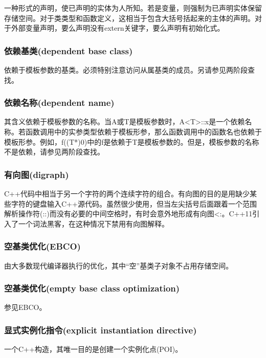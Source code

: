 一种形式的声明，使已声明的实体为人所知。若是变量，则强制为已声明实体保留存储空间。对于类类型和函数定义，这相当于包含大括号括起来的主体的声明。对于外部变量声明，要么声明没有extern关键字，要么声明有初始化式。

\subsubsection{依赖基类(dependent base class)}

依赖于模板参数的基类。必须特别注意访问从属基类的成员。另请参见两阶段查找。

\subsubsection{依赖名称(dependent name)}

其含义依赖于模板参数的名称。当A或T是模板参数时，A<T>::x是一个依赖名称。若函数调用中的实参类型依赖于模板形参，那么函数调用中的函数名也依赖于模板形参。例如，f((T*)0)中的f是依赖于T是模板参数的。但是，模板参数的名称不是依赖，请参见两阶段查找。

\subsubsection{有向图(digraph)}

C++代码中相当于另一个字符的两个连续字符的组合。有向图的目的是用缺少某些字符的键盘输入C++源代码。虽然很少使用，但当左尖括号后面跟着一个范围解析操作符(::)而没有必要的中间空格时，有时会意外地形成有向图<:。C++11引入了一个词法黑客，在这种情况下禁用有向图解释。

\subsubsection{空基类优化(EBCO)}

由大多数现代编译器执行的优化，其中“空”基类子对象不占用存储空间。

\subsubsection{空基类优化(empty base class optimization)}

参见EBCO。

\subsubsection{显式实例化指令(explicit instantiation directive)}

一个C++构造，其唯一目的是创建一个实例化点(POI)。

